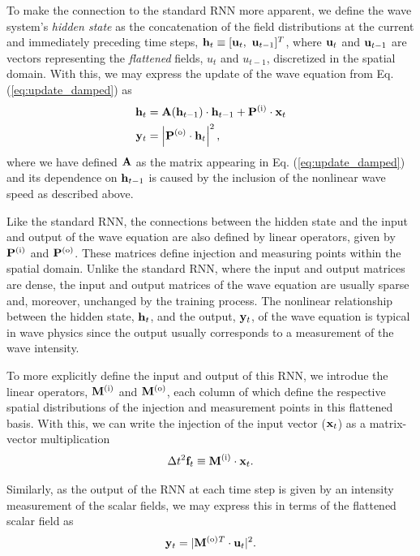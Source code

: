 To make the connection to the standard RNN more apparent, we define the wave system's \textit{hidden state} as the concatenation of the field distributions at the current and immediately preceding time steps, $\mathbf{h}_t \equiv [\mathbf{u}_t,~\mathbf{u}_{t-1}]^T$, where $\mathbf{u}_t$ and $\mathbf{u}_{t-1}$ are vectors representing the \textit{flattened} fields, $u_t$ and $u_{t-1}$, discretized in the spatial domain.  With this, we may express the update of the wave equation from Eq. (\ref{eq:update_damped}) as
%
\begin{align}
\mathbf{h}_t &= \mathbf{A}{\left(\mathbf{h}_{t-1}\right)} \cdot \mathbf{h}_{t-1} + \mathbf{P}^{(\textrm{i})} \cdot \mathbf{x}_t \label{eq:sup_ScalarRNN1}\\
\mathbf{y}_t &= \left\vert \mathbf{P}^{(\textrm{o})} \cdot \mathbf{h}_t \right\vert^2, \label{eq:sup_ScalarRNN2}
\end{align}
where we have defined $\mathbf{A}$ as the matrix appearing in Eq. (\ref{eq:update_damped}) and its  dependence on $\mathbf{h}_{t-1}$ is caused by the inclusion of the nonlinear wave speed as described above.

Like the standard RNN, the connections between the hidden state and the input and output of the wave equation are also defined by linear operators, given by $\mathbf{P}^{(\textrm{i})}$ and $\mathbf{P}^{(\textrm{o})}$. 
These matrices define injection and measuring points within the spatial domain.
Unlike the standard RNN, where the input and output matrices are dense, the input and output matrices of the wave equation are usually sparse and, moreover, unchanged by the training process.
The nonlinear relationship between the hidden state, $\mathbf{h}_t$, and the output, $\mathbf{y}_t$, of the wave equation is typical in wave physics since the output usually corresponds to a measurement of the wave intensity.

To more explicitly define the input and output of this RNN, we introdue the linear operators, $\mathbf{M}^{(\textrm{i})}$ and $\mathbf{M}^{(\textrm{o})}$, each column of which define the respective spatial distributions of the injection and measurement points in this flattened basis.
With this, we can write the injection of the input vector ($\mathbf{x}_t$) as a matrix-vector multiplication
%
\begin{equation}
    \Delta t^2 \mathbf{f}_t \equiv \mathbf{M}^{(\textrm{i})} \cdot \mathbf{x}_t.
\end{equation}

Similarly, as the output of the RNN at each time step is given by an intensity measurement of the scalar fields, we may express this in terms of the flattened scalar field as
\begin{equation}
    \mathbf{y}_t = |\mathbf{M}^{(\textrm{o})}{}^T \cdot \mathbf{u}_t|^2.
\end{equation}

